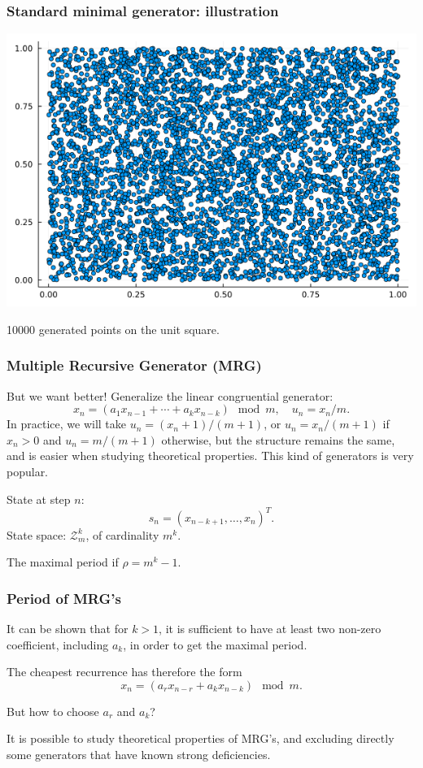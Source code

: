\documentclass{beamer}
\begin{document}
	\begin{frame}
		\frametitle{Standard minimal generator: illustration}
		\begin{center}
			\includegraphics[width=0.8\linewidth]{imgs/lcg.png}
			
			10000 generated points on the unit square.
		\end{center}
		
	\end{frame}
	
	\begin{frame}
		\frametitle{Multiple Recursive Generator (MRG)}
		
		But we want better! Generalize the linear congruential generator:
		\[
		x_n = (a_1 x_{n-1} + \cdots + a_k x_{n-k}) \mod {m}, \quad  
		u_n = x_n / m.
		\]
		In practice, we will take $u_n = (x_n + 1) / (m+1)$, or $u_n =
		x_n/(m+1)$ if $x_n>0$ and $u_n = m/(m+1)$ otherwise, but the structure
		remains the same, and is easier when studying theoretical properties.
		This kind of generators is very popular.
		
		\mbox{}
		
		State at step $n$:
		\[
		s_n = (x_{n-k+1},\dots,x_n)^T.
		\]
		State space: $\mathcal{Z}_m^k$, of cardinality $m^k$.
		
		\mbox{}
		
		The maximal period if $\rho = m^k-1$.
		
	\end{frame}
	
	\begin{frame}
		\frametitle{Period of MRG's}
		
		It can be shown that for $k > 1$, it is sufficient to have at least
		two non-zero coefficient, including $a_k$, in order to get the maximal
		period.
		
		\mbox{}
		
		The cheapest recurrence has therefore the form
		\[
		x_n = (a_r x_{n-r} + a_k x_{n-k}) \mod m.
		\]
		
		\mbox{}
		
		But how to choose $a_r$ and $a_k$?
		
		\mbox{}
		
		It is possible to study theoretical properties of MRG's, and excluding
		directly some generators that have known strong deficiencies.
		
	\end{frame}
	
\end{document}
